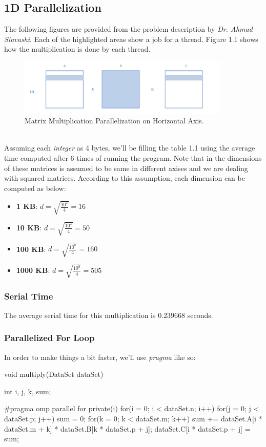 \documentclass[12pt]{article}
\numberwithin{equation}{section}
\numberwithin{table}{section}
\numberwithin{figure}{section}
\begin{document}
\subsection{1D Parallelization}
The following figures are provided from the problem description by \textit{Dr. Ahmad Siavashi}. Each of the highlighted areas show a job for a thread. Figure 1.1 shows how the multiplication is done by each thread.
\begin{figure}[!h]\centering
	\includegraphics[width=0.9\textwidth]{one_dimensional.png}
	\caption{Matrix Multiplication Parallelization on Horizontal Axis.}
	\label{figsolplot}
\end{figure}\\
Assuming each \textit{integer} as 4 bytes, we'll be filling the table 1.1 using the average time computed after 6 times of running the program. Note that in the dimensions of these matrices is assumed to be same in different axises and we are dealing with squared matrices. According to this assumption, each dimension can be computed as below:
\begin{itemize}
	\item \textbf{1 KB}: $d = \sqrt{\frac{10^3}{4}} = 16$
	\item \textbf{10 KB}: $d = \sqrt{\frac{10^4}{4}} = 50$
	\item \textbf{100 KB}:  $d = \sqrt{\frac{10^8}{4}} = 160$
	\item \textbf{1000 KB}:  $d = \sqrt{\frac{10^9}{4}} = 505$
\end{itemize}
\subsubsection{Serial Time}
The average serial time for this multiplication is $0.239668$ seconds.
\subsubsection{Parallelized For Loop}
In order to make things a bit faster, we'll use \textit{pragma} like so:
\begin{cpp}
		void multiply(DataSet dataSet){
			int i, j, k, sum;
			
			#pragma omp parallel for private(i)
			for(i = 0; i < dataSet.n; i++){
				for(j = 0; j < dataSet.p; j++){
					sum = 0;
					for(k = 0; k < dataSet.m; k++){
						sum += dataSet.A[i * dataSet.m + k] * dataSet.B[k * dataSet.p + j];
					}
					dataSet.C[i * dataSet.p + j] = sum;
				}
			}
		}
\end{cpp}
\end{document}

